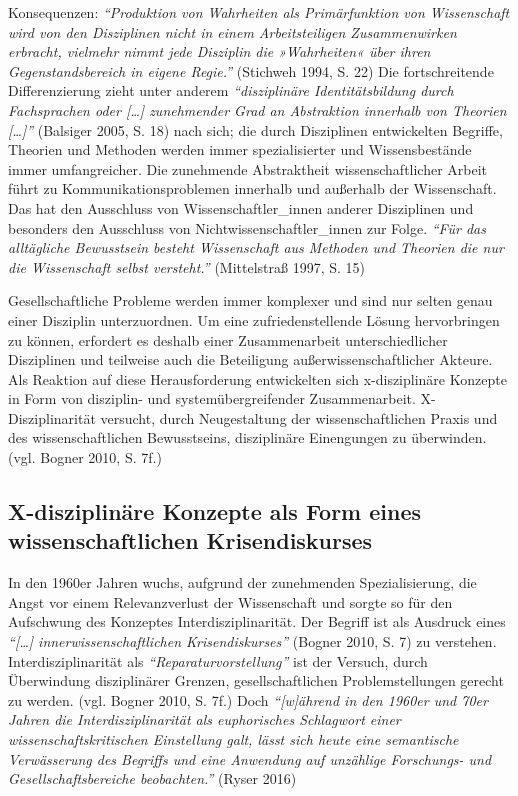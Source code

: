 \documentclass[a4paper,
fontsize=11pt,
oneside,
numbers=noperiodatend,
parskip=half-,
bibliography=totoc,
final
]{scrartcl}
\begin{document}
Konsequenzen: \emph{\enquote{Produktion von Wahrheiten als
Primärfunktion von Wissenschaft wird von den Disziplinen nicht in einem
Arbeitsteiligen Zusammenwirken erbracht, vielmehr nimmt jede Disziplin
die »Wahrheiten« über ihren Gegenstandsbereich in eigene Regie.}}
(Stichweh 1994, S. 22) Die fortschreitende Differenzierung zieht unter
anderem \emph{\enquote{disziplinäre Identitätsbildung durch Fachsprachen
oder {[}\ldots{}{]} zunehmender Grad an Abstraktion innerhalb von
Theorien {[}\ldots{}{]}}} (Balsiger 2005, S. 18) nach sich; die durch
Disziplinen entwickelten Begriffe, Theorien und Methoden werden immer
spezialisierter und Wissensbestände immer umfangreicher. Die zunehmende
Abstraktheit wissenschaftlicher Arbeit führt zu Kommunikationsproblemen
innerhalb und außerhalb der Wissenschaft. Das hat den Ausschluss von
Wissenschaftler\_innen anderer Disziplinen und besonders den Ausschluss
von Nichtwissenschaftler\_innen zur Folge. \emph{\enquote{Für das
alltägliche Bewusstsein besteht Wissenschaft aus Methoden und Theorien
die nur die Wissenschaft selbst versteht.}} (Mittelstraß 1997, S. 15)

Gesellschaftliche Probleme werden immer komplexer und sind nur selten
genau einer Disziplin unterzuordnen. Um eine zufriedenstellende Lösung
hervorbringen zu können, erfordert es deshalb einer Zusammenarbeit
unterschiedlicher Disziplinen und teilweise auch die Beteiligung
außerwissenschaftlicher Akteure. Als Reaktion auf diese Herausforderung
entwickelten sich x-disziplinäre Konzepte in Form von disziplin- und
systemübergreifender Zusammenarbeit. X-Disziplinarität versucht, durch
Neugestaltung der wissenschaftlichen Praxis und des wissenschaftlichen
Bewusstseins, disziplinäre Einengungen zu überwinden. (vgl. Bogner 2010,
S. 7f.)

\subsection*{X-disziplinäre Konzepte als Form eines wissenschaftlichen
Krisendiskurses}\label{x-disziplinuxe4re-konzepte-als-form-eines-wissenschaftlichen-krisendiskurses}

In den 1960er Jahren wuchs, aufgrund der zunehmenden Spezialisierung,
die Angst vor einem Relevanzverlust der Wissenschaft und sorgte so für
den Aufschwung des Konzeptes Interdisziplinarität. Der Begriff ist als
Ausdruck eines \emph{\enquote{{[}\ldots{}{]} innerwissenschaftlichen
Krisendiskurses}} (Bogner 2010, S. 7) zu verstehen. Interdisziplinarität
als \emph{\enquote{Reparaturvorstellung}} ist der Versuch, durch
Überwindung disziplinärer Grenzen, gesellschaftlichen Problemstellungen
gerecht zu werden. (vgl. Bogner 2010, S. 7f.) Doch
\emph{\enquote{{[}w{]}ährend in den 1960er und 70er Jahren die
Interdisziplinarität als euphorisches Schlagwort einer
wissenschaftskritischen Einstellung galt, lässt sich heute eine
semantische Verwässerung des Begriffs und eine Anwendung auf unzählige
Forschungs- und Gesellschaftsbereiche beobachten.}} (Ryser 2016)
\end{document}
